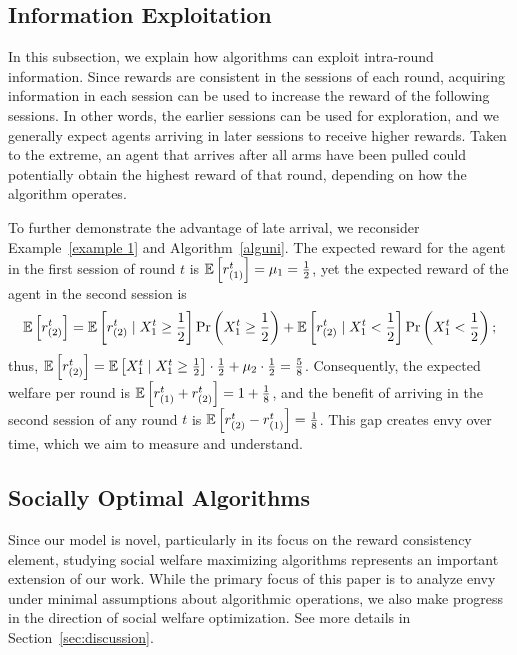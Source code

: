 \subsection{Information Exploitation}
\label{subsec:information}

In this subsection, we explain how algorithms can exploit intra-round information.
Since rewards are consistent in the sessions of each round, acquiring information in each session can be used to increase the reward of the following sessions.
In other words, the earlier sessions can be used for exploration, and we generally expect agents arriving in later sessions to receive higher rewards.
Taken to the extreme, an agent that arrives after all arms have been pulled could potentially obtain the highest reward of that round, depending on how the algorithm operates.

To further demonstrate the advantage of late arrival, we reconsider Example~\ref{example 1} and Algorithm~\ref{alguni}. 
The expected reward for the agent in the first session of round $t$ is $\mathbb{E}\left[ r_{(1)}^t \right]=\mu_1=\frac{1}{2}$, yet the expected reward of the agent in the second session is
\begin{align*}
\mathbb{E}\left[ r_{(2)}^t \right]=\mathbb{E}\left[ r_{(2)}^t\mid X^t_1 \geq \frac{1}{2}  \right]\Pr\left( X^t_1 \geq \frac{1}{2} \right) + \mathbb{E}\left[ r_{(2)}^t\mid X^t_1 < \frac{1}{2}  \right]\Pr\left( X^t_1 < \frac{1}{2} \right);
\end{align*}
thus, $\mathbb{E}\left[ r_{(2)}^t \right] =\mathbb{E}\left[ X^t_1\mid X^t_1 \geq \frac{1}{2}  \right]\cdot \frac{1}{2} + \mu_2\cdot\frac{1}{2} = \frac{5}{8}$.
Consequently, the expected welfare per round is $\mathbb{E}\left[ r_{(1)}^t+r_{(2)}^t \right]=1+\frac{1}{8}$, and the benefit of arriving in the second session of any round $t$ is $\mathbb{E}\left[ r_{(2)}^t - r_{(1)}^t \right] = \frac{1}{8}$. This gap creates envy over time, which we aim to measure and understand.
\subsection{Socially Optimal Algorithms}
\label{sec: sw}
Since our model is novel, particularly in its focus on the reward consistency element, studying social welfare maximizing algorithms represents an important extension of our work. While the primary focus of this paper is to analyze envy under minimal assumptions about algorithmic operations, we also make progress in the direction of social welfare optimization. See more details in Section~\ref{sec:discussion}.%




